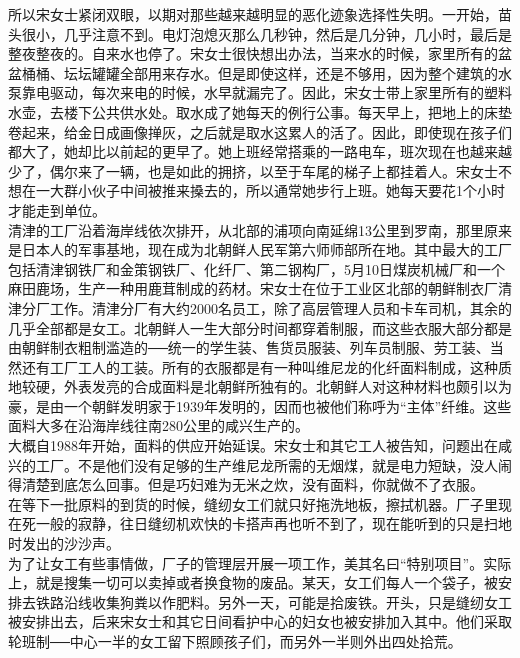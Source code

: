 所以宋女士紧闭双眼，以期对那些越来越明显的恶化迹象选择性失明。一开始，苗头很小，几乎注意不到。电灯泡熄灭那么几秒钟，然后是几分钟，几小时，最后是整夜整夜的。自来水也停了。宋女士很快想出办法，当来水的时候，家里所有的盆盆桶桶、坛坛罐罐全部用来存水。但是即使这样，还是不够用，因为整个建筑的水泵靠电驱动，每次来电的时候，水早就漏完了。因此，宋女士带上家里所有的塑料水壶，去楼下公共供水处。取水成了她每天的例行公事。每天早上，把地上的床垫卷起来，给金日成画像掸灰，之后就是取水这累人的活了。因此，即使现在孩子们都大了，她却比以前起的更早了。她上班经常搭乘的一路电车，班次现在也越来越少了，偶尔来了一辆，也是如此的拥挤，以至于车尾的梯子上都挂着人。宋女士不想在一大群小伙子中间被推来搡去的，所以通常她步行上班。她每天要花1个小时才能走到单位。\\

清津的工厂沿着海岸线依次排开，从北部的浦项向南延绵13公里到罗南，那里原来是日本人的军事基地，现在成为北朝鲜人民军第六师师部所在地。其中最大的工厂包括清津钢铁厂和金策钢铁厂、化纤厂、第二钢构厂，5月10日煤炭机械厂和一个麻田鹿场，生产一种用鹿茸制成的药材。宋女士在位于工业区北部的朝鲜制衣厂清津分厂工作。清津分厂有大约2000名员工，除了高层管理人员和卡车司机，其余的几乎全部都是女工。北朝鲜人一生大部分时间都穿着制服，而这些衣服大部分都是由朝鲜制衣粗制滥造的──统一的学生装、售货员服装、列车员制服、劳工装、当然还有工厂工人的工装。所有的衣服都是有一种叫维尼龙的化纤面料制成，这种质地较硬，外表发亮的合成面料是北朝鲜所独有的。北朝鲜人对这种材料也颇引以为豪，是由一个朝鲜发明家于1939年发明的，因而也被他们称呼为“主体”纤维。这些面料大多在沿海岸线往南280公里的咸兴生产的。\\

大概自1988年开始，面料的供应开始延误。宋女士和其它工人被告知，问题出在咸兴的工厂。不是他们没有足够的生产维尼龙所需的无烟煤，就是电力短缺，没人闹得清楚到底怎么回事。但是巧妇难为无米之炊，没有面料，你就做不了衣服。\\

在等下一批原料的到货的时候，缝纫女工们就只好拖洗地板，擦拭机器。厂子里现在死一般的寂静，往日缝纫机欢快的卡搭声再也听不到了，现在能听到的只是扫地时发出的沙沙声。\\

为了让女工有些事情做，厂子的管理层开展一项工作，美其名曰“特别项目”。实际上，就是搜集一切可以卖掉或者换食物的废品。某天，女工们每人一个袋子，被安排去铁路沿线收集狗粪以作肥料。另外一天，可能是拾废铁。开头，只是缝纫女工被安排出去，后来宋女士和其它日间看护中心的妇女也被安排加入其中。他们采取轮班制──中心一半的女工留下照顾孩子们，而另外一半则外出四处拾荒。\\

